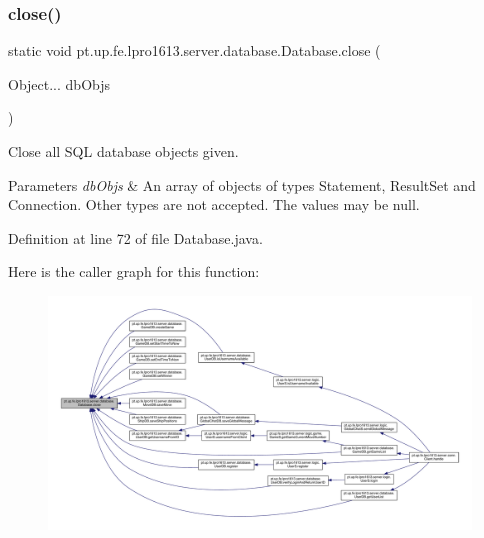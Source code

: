 \subsubsection{\texorpdfstring{close()}{close()}}
{\footnotesize\ttfamily static void pt.\+up.\+fe.\+lpro1613.\+server.\+database.\+Database.\+close (\begin{DoxyParamCaption}\item[{Object...}]{db\+Objs }\end{DoxyParamCaption})\hspace{0.3cm}{\ttfamily [static]}}

Close all S\+QL database objects given. 
\begin{DoxyParams}{Parameters}
{\em db\+Objs} & An array of objects of types {\ttfamily Statement}, {\ttfamily Result\+Set} and {\ttfamily Connection}. Other types are not accepted. The values may be null. \\
\hline
\end{DoxyParams}


Definition at line 72 of file Database.\+java.

Here is the caller graph for this function\+:
\nopagebreak
\begin{figure}[H]
\begin{center}
\leavevmode
\includegraphics[width=350pt]{classpt_1_1up_1_1fe_1_1lpro1613_1_1server_1_1database_1_1_database_ae7e6a39f412e24bea44477224f0fdef0_icgraph}
\end{center}
\end{figure}
\hypertarget{classpt_1_1up_1_1fe_1_1lpro1613_1_1server_1_1database_1_1_database_aa5ecc24c87d16ca20cc645414d8f3232}{}\label{classpt_1_1up_1_1fe_1_1lpro1613_1_1server_1_1database_1_1_database_aa5ecc24c87d16ca20cc645414d8f3232} 
